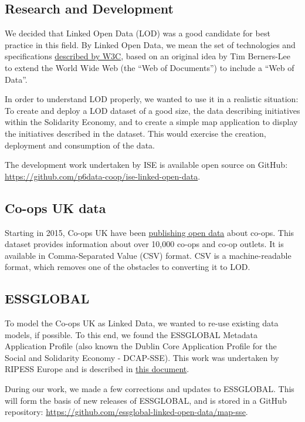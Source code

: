 \documentclass[11pt,twoside,a4paper]{article}
\begin{document}
\subsection{Research and Development}
We decided that Linked Open Data (LOD) was a good candidate for best practice in this field.
By Linked Open Data, we mean the set of technologies and specifications \href{https://www.w3.org/standards/semanticweb/data}{described by W3C}, based on an original idea by Tim Berners-Lee to extend the World Wide Web (the ``Web of Documents'') to include a ``Web of Data''. 

In order to understand LOD properly, we wanted to use it in a realistic situation: 
To create and deploy a LOD dataset of a good size, the data describing initiatives within the Solidarity Economy,
and to create a simple map application to display the initiatives described in the dataset. 
This would exercise the creation, deployment and consumption of the data.

The development work undertaken by ISE is available open source on GitHub:
\url{https://github.com/p6data-coop/ise-linked-open-data}.

\subsection{Co-ops UK data}

Starting in 2015, Co-ops UK have been
\href{https://www.uk.coop/economy2015/access-data}{publishing open data}
about co-ops.
This dataset provides information about over 10,000 co-ops and co-op outlets.
It is available in Comma-Separated Value (CSV) format.
CSV is a machine-readable format, which removes one of the obstacles to converting it to LOD.

\subsection{ESSGLOBAL}

To model the Co-ops UK as Linked Data,
we wanted to re-use existing data models, if possible.
To this end, we found the ESSGLOBAL Metadata Application Profile
(also known the Dublin Core Application Profile for the Social and Solidarity Economy - DCAP-SSE).
This work was undertaken by RIPESS Europe and is described in 
\href{http://ripess.eu/wp-content/uploads/2014/07/ESSglobal_interop_guidelines.pdf}{this document}.

During our work, we made a few corrections and updates to ESSGLOBAL.
This will form the basis of new releases of ESSGLOBAL, and is stored in a GitHub repository:
\url{https://github.com/essglobal-linked-open-data/map-sse}.
\end{document}
